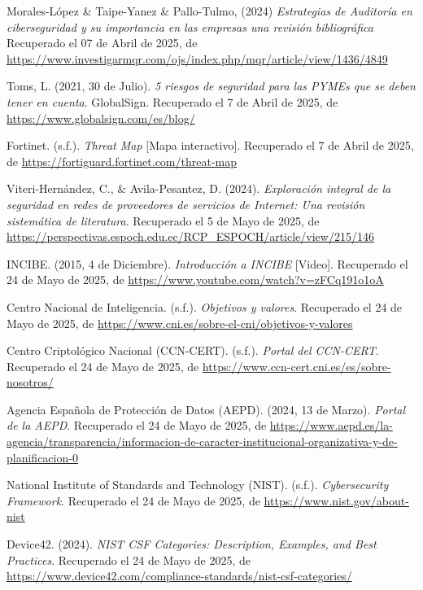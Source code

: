 \documentclass[a4paper, 11pt]{article}
\begin{document}
\begin{thebibliography}{99}
    Morales-López \& Taipe-Yanez \& Pallo-Tulmo, (2024) \textit{Estrategias de Auditoría en ciberseguridad y su importancia en las empresas una revisión bibliográfica} Recuperado el 07 de Abril de 2025, de \url{https://www.investigarmqr.com/ojs/index.php/mqr/article/view/1436/4849}

    Toms, L. (2021, 30 de Julio). \textit{5 riesgos de seguridad para las PYMEs que se deben tener en cuenta}. GlobalSign. Recuperado el 7 de Abril de 2025, de \href{https://www.globalsign.com/es/blog/top-5-pequena-empresa-grandes-riesgos-5-riesgos-de-seguridad-para-las-pymes-que-se-deben-tener-en-cuenta}{https://www.globalsign.com/es/blog/} 
        
    Fortinet. (s.f.). \textit{Threat Map} [Mapa interactivo]. Recuperado el 7 de Abril de 2025, de \url{https://fortiguard.fortinet.com/threat-map}

    Viteri-Hernández, C., \& Avila-Pesantez, D. (2024). \textit{Exploración integral de la seguridad en redes de proveedores de servicios de Internet: Una revisión sistemática de literatura}. Recuperado el 5 de Mayo de 2025, de \url{https://perspectivas.espoch.edu.ec/RCP_ESPOCH/article/view/215/146}
        
    INCIBE. (2015, 4 de Diciembre). \textit{Introducción a INCIBE} [Video]. Recuperado el 24 de Mayo de 2025, de \url{https://www.youtube.com/watch?v=zFCq191o1oA}

    Centro Nacional de Inteligencia. (s.f.). \textit{Objetivos y valores}. Recuperado el 24 de Mayo de 2025, de \url{https://www.cni.es/sobre-el-cni/objetivos-y-valores}

    Centro Criptológico Nacional (CCN-CERT). (s.f.). \textit{Portal del CCN-CERT}. Recuperado el 24 de Mayo de 2025, de \url{https://www.ccn-cert.cni.es/es/sobre-nosotros/}

    Agencia Española de Protección de Datos (AEPD). (2024, 13 de Marzo). \textit{Portal de la AEPD}. Recuperado el 24 de Mayo de 2025, de \url{https://www.aepd.es/la-agencia/transparencia/informacion-de-caracter-institucional-organizativa-y-de-planificacion-0}

    National Institute of Standards and Technology (NIST). (s.f.). \textit{Cybersecurity Framework}. Recuperado el 24 de Mayo de 2025, de \url{https://www.nist.gov/about-nist}

    Device42. (2024). \textit{NIST CSF Categories: Description, Examples, and Best Practices}. Recuperado el 24 de Mayo de 2025, de \url{https://www.device42.com/compliance-standards/nist-csf-categories/}


\end{thebibliography}
\end{document}
